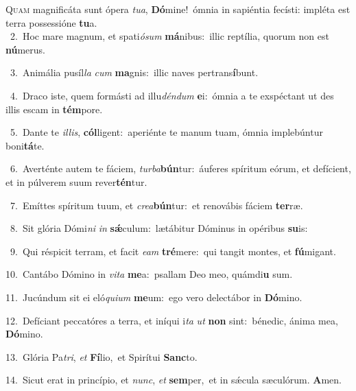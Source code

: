 \lettrine{\initial\textcolor{\initialcolor}{Q}}{uam} magnificáta sunt ópera \textit{tu}\-\textit{a}, \textbf{Dó}\-mine!~\star ómnia in sapiéntia fecísti: impléta est terra possessióne \textbf{tu}\-a.\\
{\numbfont\textcolor{\numbcolor}{~2.}}~Hoc mare magnum, et spati\-\textit{ó}\-\textit{sum} \textbf{má}\-nibus:~\star illic reptília, quorum non est \textbf{nú}\-merus.\par
{\numbfont\textcolor{\numbcolor}{~3.}}~Animália pusíl\textit{la} \textit{cum} \textbf{ma}\-gnis:~\star illic naves pertrans\-\textbf{í}\-bunt.\par
{\numbfont\textcolor{\numbcolor}{~4.}}~Draco iste, quem formásti ad illu\-\textit{dén}\-\textit{dum} \textbf{e}\-i:~\star ómnia a te exspéctant ut des illis escam in \textbf{tém}\-pore.\par
{\numbfont\textcolor{\numbcolor}{~5.}}~Dante te \textit{il}\-\textit{lis}, \textbf{cól}\-ligent:~\star aperiénte te manum tuam, ómnia implebúntur boni\-\textbf{tá}\-te.\par
{\numbfont\textcolor{\numbcolor}{~6.}}~Averténte autem te fáciem, \textit{tur}\-\textit{ba}\textbf{bún}tur:~\star áuferes spíritum eórum, et defícient, et in púlverem suum rever\-\textbf{tén}\-tur.\par
{\numbfont\textcolor{\numbcolor}{~7.}}~Emíttes spíritum tuum, et \textit{cre}\-\textit{a}\textbf{bún}tur:~\star et renovábis fáciem \textbf{ter}\-ræ.\par
{\numbfont\textcolor{\numbcolor}{~8.}}~Sit glória Dómi\textit{ni} \textit{in} \textbf{sǽ}\-culum:~\star lætábitur Dóminus in opéribus \textbf{su}\-is:\par
{\numbfont\textcolor{\numbcolor}{~9.}}~Qui réspicit terram, et facit \textit{e}\-\textit{am} \textbf{tré}\-mere:~\star qui tangit montes, et \textbf{fú}\-migant.\par
{\numbfont\textcolor{\numbcolor}{10.}}~Cantábo Dómino in \textit{vi}\-\textit{ta} \textbf{me}\-a:~\star psallam Deo meo, quámdi\textbf{u} sum.\par
{\numbfont\textcolor{\numbcolor}{11.}}~Jucúndum sit ei eló\-\textit{qui}\-\textit{um} \textbf{me}\-um:~\star ego vero delectábor in \textbf{Dó}\-mino.\par
{\numbfont\textcolor{\numbcolor}{12.}}~Defíciant peccatóres a terra, et iníqui i\textit{ta} \textit{ut} \textbf{non} sint:~\star bénedic, ánima mea, \textbf{Dó}\-mino.\par
{\numbfont\textcolor{\numbcolor}{13.}}~Glória Pa\-\textit{tri}\-, \textit{et} \textbf{Fí}\-lio,~\star et Spirítui \textbf{Sanc}\-to.\par
{\numbfont\textcolor{\numbcolor}{14.}}~Sicut erat in princípio, et \textit{nunc}\-, \textit{et} \textbf{sem}\-per,~\star et in sǽcula sæculórum. \textbf{A}\-men.\par
